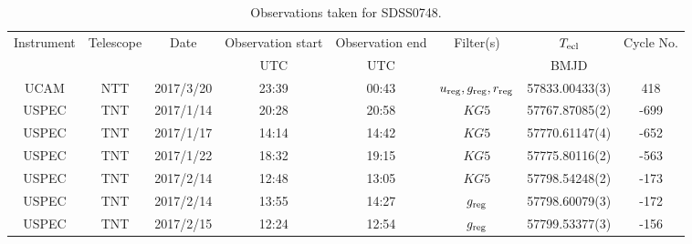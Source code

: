 \begin{table}
	\begin{center}
		\caption{Observations taken for SDSS0748.}
		\label{table:observing:observation logs SDSS0748}
		\begin{tabular}{cccccccc}
			\hline
			Instrument & Telescope & Date & Observation start & Observation end & Filter(s) & $T_{\rm ecl}$ & Cycle No. \\
			 &  &  & UTC & UTC &  & BMJD &  \\
			\hline
			\hline
			UCAM  & NTT     & 2017/3/20  & 23:39 & 00:43 & $u_{\rm reg},g_{\rm reg},r_{\rm reg}$ & 57833.00433(3)                                                                                                            &                                         418 \\
			USPEC & TNT     & 2017/1/14  & 20:28 & 20:58 & $KG5$                                 & 57767.87085(2)                                                                                                            &                                        -699 \\
			USPEC & TNT     & 2017/1/17  & 14:14 & 14:42 & $KG5$                                 & 57770.61147(4)                                                                                                            &                                        -652 \\
			USPEC & TNT     & 2017/1/22  & 18:32 & 19:15 & $KG5$                                 & 57775.80116(2)                                                                                                            &                                        -563 \\
			USPEC & TNT     & 2017/2/14  & 12:48 & 13:05 & $KG5$                                 & 57798.54248(2)                                                                                                            &                                        -173 \\
			USPEC & TNT     & 2017/2/14  & 13:55 & 14:27 & $g_{\rm reg}$                         & 57798.60079(3)                                                                                                            &                                        -172 \\
			USPEC & TNT     & 2017/2/15  & 12:24 & 12:54 & $g_{\rm reg}$                         & 57799.53377(3)                                                                                                            &                                        -156 \\

\end{tabular}
\end{center}
\end{table}
